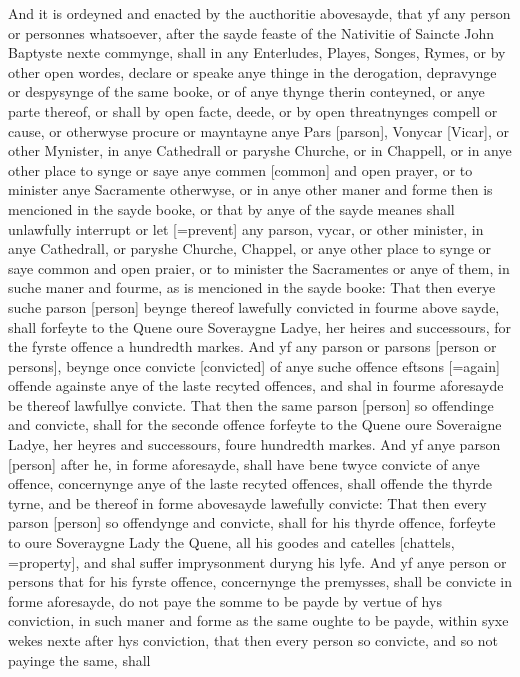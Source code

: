 And it is ordeyned and enacted by the aucthoritie
abovesayde, that yf any person or personnes whatsoever, after the sayde
feaste of the Nativitie of Saincte John Baptyste nexte commynge, shall
in any Enterludes, Playes, Songes, Rymes, or by other open wordes, declare
or speake anye thinge in the derogation, depravynge or despysynge of
the same booke, or of anye thynge therin conteyned, or anye parte thereof,
or shall by open facte, deede, or by open threatnynges compell or cause,
or otherwyse procure or mayntayne anye Pars [parson],
Vonycar [Vicar], or other Mynister,
in anye Cathedrall or paryshe Churche, or in Chappell, or in anye other
place to synge or saye anye commen [common]
and open prayer, or to minister anye Sacramente otherwyse, or in anye
other maner and forme then is mencioned in the sayde booke, or that
by anye of the sayde meanes shall unlawfully interrupt or let [=prevent]
any parson, vycar, or other minister, in anye Cathedrall, or paryshe
Churche, Chappel, or anye other place to synge or saye common and open
praier, or to minister the Sacramentes or anye of them, in suche maner
and fourme, as is mencioned in the sayde booke: That then everye suche
parson [person] beynge thereof
lawefully convicted in fourme above sayde, shall forfeyte to the Quene
oure Soveraygne Ladye, her heires and successours, for the fyrste offence
a hundredth markes. And yf any parson or parsons [person
or persons], beynge once convicte [convicted]
of anye suche offence eftsons [=again]
offende againste anye of the laste recyted offences, and shal in fourme
aforesayde be thereof lawfullye convicte. That then the same parson
[person] so offendinge and convicte,
shall for the seconde offence forfeyte to the Quene oure Soveraigne
Ladye, her heyres and successours, foure hundredth markes. And yf anye
parson [person] after he, in
forme aforesayde, shall have bene twyce convicte of anye offence, concernynge
anye of the laste recyted offences, shall offende the thyrde tyrne,
and be thereof in forme abovesayde lawefully convicte: That then every
parson [person] so offendynge
and convicte, shall for his thyrde offence, forfeyte to oure Soveraygne
Lady the Quene, all his goodes and catelles [chattels,
=property], and shal suffer imprysonment duryng his lyfe. And
yf anye person or persons that for his fyrste offence, concernynge the
premysses, shall be convicte in forme aforesayde, do not paye the somme
to be payde by vertue of hys conviction, in such maner and forme as
the same oughte to be payde, within syxe wekes nexte after hys conviction,
that then every person so convicte, and so not payinge the same, shall
